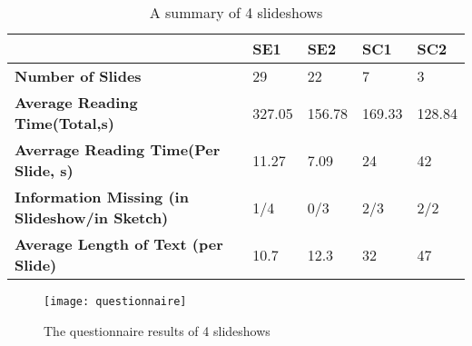 \begin{table}
  \caption{A summary of 4 slideshows}
  \label{tab:slides1}
  \small
  \centering
  \begin{tabu}{p{2cm}|p{0.9cm}|p{0.9cm}|p{0.9cm}|p{0.9cm}}
  \toprule
 \textbf{} &\textbf{SE1} & \textbf{SE2} & \textbf{SC1}& \textbf{SC2} \\ 
   \midrule
  \textbf{Number of Slides } & 29  & 22 & 7 & 3 \\ 
 \midrule
  \textbf{Average Reading Time(Total,s)} & 327.05 & 156.78 & 169.33 & 128.84\\ 
 \midrule
  \textbf{Averrage Reading Time(Per Slide, s)} & 11.27 & 7.09 &24 & 42\\ 
   \midrule
  \textbf{Information Missing (in Slideshow/in Sketch) }& 1/4 & 0/3 & 2/3 & 2/2\\ 
     \midrule
  \textbf{Average Length of Text (per Slide) }& 10.7 & 12.3 & 32 & 47\\ 
    
  \bottomrule

  \end{tabu}
  \vspace{1mm}
\end{table}



%  
%

\begin{figure}
 \centering %
 \texttt{[image: questionnaire]}
 \caption{The questionnaire results of 4 slideshows
 }
 \label{fig:questionnaire}
\end{figure}

